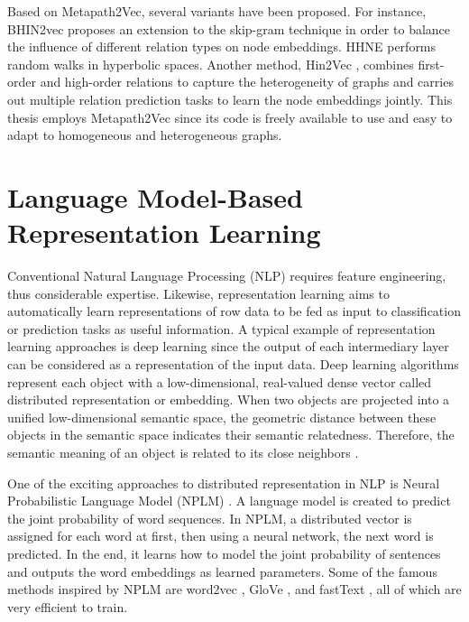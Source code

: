 Based on Metapath2Vec, several variants have been proposed. For instance, BHIN2vec \cite{lee2019bhin2vec} proposes an extension to the skip-gram technique in order to balance the influence of different relation types on node embeddings. HHNE \cite{wang2019hyperbolic} performs random walks in hyperbolic spaces. Another method, Hin2Vec \cite{fu2017hin2vec}, combines first-order and high-order relations to capture the heterogeneity of graphs and carries out multiple relation prediction tasks to learn the node embeddings jointly. This thesis employs Metapath2Vec since its code is freely available to use and easy to adapt to homogeneous and heterogeneous graphs.

\section{Language Model-Based Representation Learning}
\label{section:languagE_rep_le}
Conventional Natural Language Processing (NLP) requires feature engineering, thus considerable expertise. Likewise, representation learning aims to automatically learn representations of row data to be fed as input to classification or prediction tasks as useful information. A typical example of representation learning approaches is deep learning \cite{goodfellow2016deep} since the output of each intermediary layer can be considered as a representation of the input data. Deep learning algorithms represent each object with a low-dimensional, real-valued dense vector called distributed representation or embedding. When two objects are projected into a unified low-dimensional semantic space, the geometric distance between these objects in the semantic space indicates their semantic relatedness. Therefore, the semantic meaning of an object is related to its close neighbors \cite{liu2020representation}. 

One of the exciting approaches to distributed representation in NLP is Neural Probabilistic Language Model (NPLM) \cite{bengio2001neural}. A language model is created to predict the joint probability of word sequences. In NPLM, a distributed vector is assigned for each word at first, then using a neural network, the next word is predicted. In the end, it learns how to model the joint probability of sentences and outputs the word embeddings as learned parameters. Some of the famous methods inspired by NPLM are word2vec \cite{mikolov2013distributed}, GloVe \cite{bojanowski2017enriching}, and fastText \cite{pennington2014glove}, all of which are very efficient to train. 

